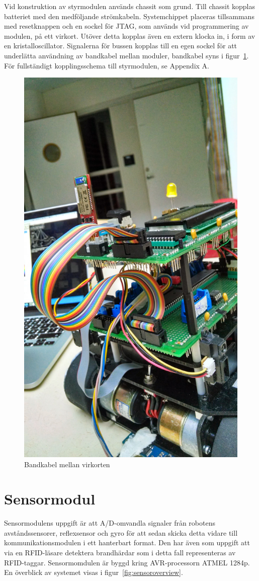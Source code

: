 \documentclass[a4paper,12pt,fleqn]{article}
\begin{document}
Vid konstruktion av styrmodulen används chassit som grund. Till chassit kopplas batteriet med den medföljande strömkabeln. Systemchippet placeras tillsammans med resetknappen och en sockel för JTAG, som används vid programmering av modulen, på ett virkort. Utöver detta kopplas även en extern klocka in, i form av en kristalloscillator. Signalerna för bussen kopplas till en egen sockel för att underlätta användning av bandkabel mellan moduler, bandkabel syns i figur~\ref{fig:band}. För fullständigt kopplingsschema till styrmodulen, se Appendix A. 

\begin{figure}[htp] %
  \begin{center}
  \includegraphics[keepaspectratio=true,width=0.5\linewidth]{bilder/robotbilder/Bandkabel.jpg}  %
  \end{center}
  \caption{Bandkabel mellan virkorten} %
  \label{fig:band}
\end{figure}

\newpage



\section{Sensormodul}
Sensormodulens uppgift är att A/D-omvandla signaler från robotens avståndssensorer, reflexsensor och gyro för att sedan skicka detta vidare till kommunikationsmodulen i ett hanterbart format. Den har även som uppgift att via en RFID-läsare detektera brandhärdar som i detta fall representeras av RFID-taggar. Sensormomdulen är byggd kring AVR-processorn ATMEL 1284p. En överblick av systemet visas i figur~\ref{fig:sensoroverview}.
\end{document}
